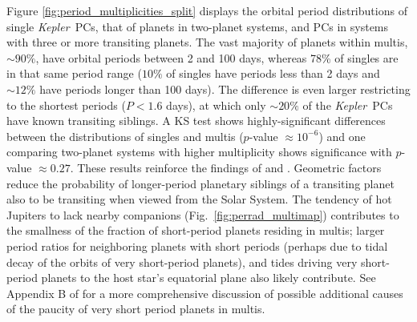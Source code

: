 \documentclass{aastex62}
\newcommand{\ik}{{\it Kepler~}}
\begin{document}
Figure \ref{fig:period_multiplicities_split} displays the orbital period distributions of single \ik PCs, that of planets in two-planet systems, and PCs in systems with three or more transiting planets. The vast majority of planets within multis, $\sim 90\%$, have orbital periods between 2 and 100 days, whereas 78\% of singles are in that same period range ($10\%$ of singles have periods less than 2 days and $\sim 12\%$ have periods longer than 100 days).  The difference is even larger restricting to the shortest periods ($P<1.6$ days), at which only $\sim 20\%$ of the \ik PCs have known transiting siblings. A KS test shows highly-significant differences between the distributions of singles and multis ($p$-value $\approx 10^{-6}$) and one comparing two-planet systems with higher multiplicity shows significance with $p$-value $\approx 0.27$. %
 These results reinforce the findings of \cite{Lissauer:2014} and  \cite{Rowe:2014}. Geometric factors reduce the probability of longer-period planetary siblings of a transiting planet also to be transiting when viewed from the Solar System. The tendency of hot Jupiters to lack nearby companions (Fig.~\ref{fig:perrad_multimap}) contributes to the smallness of the fraction of short-period planets residing in multis; larger period ratios for neighboring planets with short periods (perhaps due to tidal decay of the orbits of very short-period planets), and tides driving very short-period planets to the host star's equatorial plane also likely contribute. See Appendix B of  \cite{Lissauer:2014} for a more comprehensive discussion of possible additional causes of the paucity of very short period planets in multis. %


\end{document}
